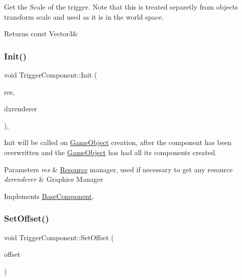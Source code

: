 Get the Scale of the trigger. Note that this is treated separetly from objects transform scale and used as it is in the world space. 

\begin{DoxyReturn}{Returns}
const Vector3\& 
\end{DoxyReturn}
\mbox{\label{classTriggerComponent_a4d843989a23752f91dfd1fe8c75c2b7c}} 
\subsubsection{\texorpdfstring{Init()}{Init()}}
{\footnotesize\ttfamily void Trigger\+Component\+::\+Init (\begin{DoxyParamCaption}\item[{\hyperlink{classResourceManager}{Resource\+Manager} $\ast$}]{res,  }\item[{\hyperlink{classDXRenderer}{D\+X\+Renderer} $\ast$}]{dxrenderer }\end{DoxyParamCaption})\hspace{0.3cm}{\ttfamily [override]}, {\ttfamily [virtual]}}



Init will be called on \hyperlink{classGameObject}{Game\+Object} creation, after the component has been overwritten and the \hyperlink{classGameObject}{Game\+Object} has had all its components created. 


\begin{DoxyParams}{Parameters}
{\em res} & \hyperlink{structResource}{Resource} manager, used if necessary to get any resource \\
\hline
{\em dxrenderer} & Graphic\textquotesingle{}s Manager \\
\hline
\end{DoxyParams}


Implements \hyperlink{classBaseComponent}{Base\+Component}.

\mbox{\label{classTriggerComponent_a2c4f80d4162ca6903d96fb7e88a26496}} 
\subsubsection{\texorpdfstring{Set\+Offset()}{SetOffset()}}
{\footnotesize\ttfamily void Trigger\+Component\+::\+Set\+Offset (\begin{DoxyParamCaption}\item[{const Vector3 \&}]{offset }\end{DoxyParamCaption})}



